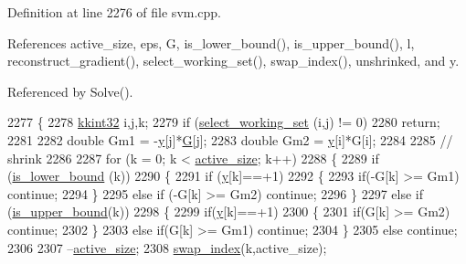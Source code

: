 Definition at line 2276 of file svm.\+cpp.



References active\+\_\+size, eps, G, is\+\_\+lower\+\_\+bound(), is\+\_\+upper\+\_\+bound(), l, reconstruct\+\_\+gradient(), select\+\_\+working\+\_\+set(), swap\+\_\+index(), unshrinked, and y.



Referenced by Solve().


\begin{DoxyCode}
2277 \{
2278   \hyperlink{namespace_k_k_b_a8fa4952cc84fda1de4bec1fbdd8d5b1b}{kkint32} i,j,k;
2279   \textcolor{keywordflow}{if}  (\hyperlink{class_s_v_m233_1_1_solver_ae0275309f3d4ae9dccf0843bb944cc76}{select\_working\_set} (i,j) != 0) 
2280     \textcolor{keywordflow}{return};
2281 
2282   \textcolor{keywordtype}{double} Gm1 = -\hyperlink{class_s_v_m233_1_1_solver_a17e4f05ccc46afc5b9bf686eac10928d}{y}[j]*\hyperlink{class_s_v_m233_1_1_solver_a429fc1d5724c8e7547e02b74cac19f40}{G}[j];
2283   \textcolor{keywordtype}{double} Gm2 = \hyperlink{class_s_v_m233_1_1_solver_a17e4f05ccc46afc5b9bf686eac10928d}{y}[i]*G[i];
2284 
2285   \textcolor{comment}{// shrink}
2286 
2287   \textcolor{keywordflow}{for}  (k = 0;  k < \hyperlink{class_s_v_m233_1_1_solver_aaa5d0e6b5e847cf0f05d5e5a44c96d1e}{active\_size};  k++)
2288   \{
2289     \textcolor{keywordflow}{if}  (\hyperlink{class_s_v_m233_1_1_solver_a4385cbb679a61f75e464f545e8f1b7b9}{is\_lower\_bound} (k))
2290     \{
2291       \textcolor{keywordflow}{if}  (\hyperlink{class_s_v_m233_1_1_solver_a17e4f05ccc46afc5b9bf686eac10928d}{y}[k]==+1)
2292       \{
2293         \textcolor{keywordflow}{if}(-G[k] >= Gm1) \textcolor{keywordflow}{continue};
2294       \}
2295       \textcolor{keywordflow}{else} \textcolor{keywordflow}{if}  (-G[k] >= Gm2) \textcolor{keywordflow}{continue};
2296     \}
2297     \textcolor{keywordflow}{else} \textcolor{keywordflow}{if}  (\hyperlink{class_s_v_m233_1_1_solver_a5a357c7baa23e6899939e3571284d652}{is\_upper\_bound}(k))
2298     \{
2299       \textcolor{keywordflow}{if}(\hyperlink{class_s_v_m233_1_1_solver_a17e4f05ccc46afc5b9bf686eac10928d}{y}[k]==+1)
2300       \{
2301         \textcolor{keywordflow}{if}(G[k] >= Gm2) \textcolor{keywordflow}{continue};
2302       \}
2303       \textcolor{keywordflow}{else} \textcolor{keywordflow}{if}(G[k] >= Gm1) \textcolor{keywordflow}{continue};
2304     \}
2305     \textcolor{keywordflow}{else} \textcolor{keywordflow}{continue};
2306 
2307     --\hyperlink{class_s_v_m233_1_1_solver_aaa5d0e6b5e847cf0f05d5e5a44c96d1e}{active\_size};
2308     \hyperlink{class_s_v_m233_1_1_solver_a416ad5ff13353d12ee210bf287c8cddc}{swap\_index}(k,active\_size);

\end{DoxyCode}
